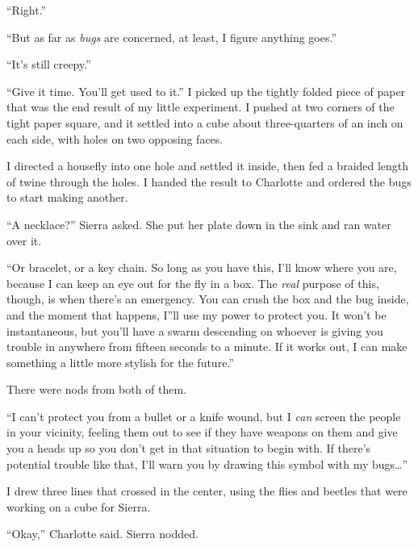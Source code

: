 ``Right.''



``But as far as \emph{bugs} are concerned, at least, I figure anything goes.''



``It's still creepy.''



``Give it time.  You'll get used to it.''  I picked up the tightly folded piece of paper that was the end result of my little experiment.  I pushed at two corners of the tight paper square, and it settled into a cube about three-quarters of an inch on each side, with holes on two opposing faces.



I directed a housefly into one hole and settled it inside, then fed a braided length of twine through the holes.  I handed the result to Charlotte and ordered the bugs to start making another.



``A necklace?''  Sierra asked.  She put her plate down in the sink and ran water over it.



``Or bracelet, or a key chain.  So long as you have this, I'll know where you are, because I can keep an eye out for the fly in a box.  The \emph{real} purpose of this, though, is when there's an emergency.  You can crush the box and the bug inside, and the moment that happens, I''ll use my power to protect you.  It won't be instantaneous, but you'll have a swarm descending on whoever is giving you trouble in anywhere from fifteen seconds to a minute.  If it works out, I can make something a little more stylish for the future.''



There were nods from both of them.



``I can't protect you from a bullet or a knife wound, but I \emph{can} screen the people in your vicinity, feeling them out to see if they have weapons on them and give you a heads up so you don't get in that situation to begin with.  If there's potential trouble like that, I'll warn you by drawing this symbol with my bugs\ldots''



I drew three lines that crossed in the center, using the flies and beetles that were working on a cube for Sierra.



``Okay,'' Charlotte said.  Sierra nodded.



